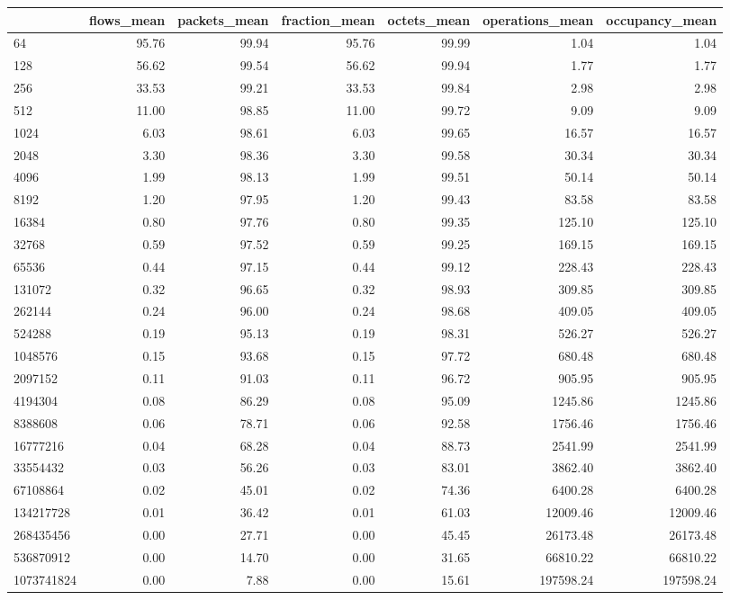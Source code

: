 \begin{tabular}{lrrrrrr}
\toprule
 & flows_mean & packets_mean & fraction_mean & octets_mean & operations_mean & occupancy_mean \\
\midrule
64 & 95.76 & 99.94 & 95.76 & 99.99 & 1.04 & 1.04 \\
128 & 56.62 & 99.54 & 56.62 & 99.94 & 1.77 & 1.77 \\
256 & 33.53 & 99.21 & 33.53 & 99.84 & 2.98 & 2.98 \\
512 & 11.00 & 98.85 & 11.00 & 99.72 & 9.09 & 9.09 \\
1024 & 6.03 & 98.61 & 6.03 & 99.65 & 16.57 & 16.57 \\
2048 & 3.30 & 98.36 & 3.30 & 99.58 & 30.34 & 30.34 \\
4096 & 1.99 & 98.13 & 1.99 & 99.51 & 50.14 & 50.14 \\
8192 & 1.20 & 97.95 & 1.20 & 99.43 & 83.58 & 83.58 \\
16384 & 0.80 & 97.76 & 0.80 & 99.35 & 125.10 & 125.10 \\
32768 & 0.59 & 97.52 & 0.59 & 99.25 & 169.15 & 169.15 \\
65536 & 0.44 & 97.15 & 0.44 & 99.12 & 228.43 & 228.43 \\
131072 & 0.32 & 96.65 & 0.32 & 98.93 & 309.85 & 309.85 \\
262144 & 0.24 & 96.00 & 0.24 & 98.68 & 409.05 & 409.05 \\
524288 & 0.19 & 95.13 & 0.19 & 98.31 & 526.27 & 526.27 \\
1048576 & 0.15 & 93.68 & 0.15 & 97.72 & 680.48 & 680.48 \\
2097152 & 0.11 & 91.03 & 0.11 & 96.72 & 905.95 & 905.95 \\
4194304 & 0.08 & 86.29 & 0.08 & 95.09 & 1245.86 & 1245.86 \\
8388608 & 0.06 & 78.71 & 0.06 & 92.58 & 1756.46 & 1756.46 \\
16777216 & 0.04 & 68.28 & 0.04 & 88.73 & 2541.99 & 2541.99 \\
33554432 & 0.03 & 56.26 & 0.03 & 83.01 & 3862.40 & 3862.40 \\
67108864 & 0.02 & 45.01 & 0.02 & 74.36 & 6400.28 & 6400.28 \\
134217728 & 0.01 & 36.42 & 0.01 & 61.03 & 12009.46 & 12009.46 \\
268435456 & 0.00 & 27.71 & 0.00 & 45.45 & 26173.48 & 26173.48 \\
536870912 & 0.00 & 14.70 & 0.00 & 31.65 & 66810.22 & 66810.22 \\
1073741824 & 0.00 & 7.88 & 0.00 & 15.61 & 197598.24 & 197598.24 \\
\bottomrule
\end{tabular}
